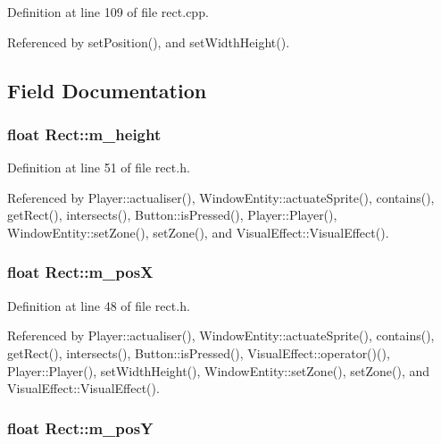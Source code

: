 Definition at line 109 of file rect.\-cpp.



Referenced by set\-Position(), and set\-Width\-Height().



\subsection{Field Documentation}
\hypertarget{class_rect_a1cec6187b299195fd06daef55e6a96f1}{
\subsubsection[{m\-\_\-height}]{\setlength{\rightskip}{0pt plus 5cm}float Rect\-::m\-\_\-height\hspace{0.3cm}{\ttfamily [protected]}}}\label{class_rect_a1cec6187b299195fd06daef55e6a96f1}


Definition at line 51 of file rect.\-h.



Referenced by Player\-::actualiser(), Window\-Entity\-::actuate\-Sprite(), contains(), get\-Rect(), intersects(), Button\-::is\-Pressed(), Player\-::\-Player(), Window\-Entity\-::set\-Zone(), set\-Zone(), and Visual\-Effect\-::\-Visual\-Effect().

\hypertarget{class_rect_aee32c031336a50f77c6cf882053e89f9}{
\subsubsection[{m\-\_\-pos\-X}]{\setlength{\rightskip}{0pt plus 5cm}float Rect\-::m\-\_\-pos\-X\hspace{0.3cm}{\ttfamily [protected]}}}\label{class_rect_aee32c031336a50f77c6cf882053e89f9}


Definition at line 48 of file rect.\-h.



Referenced by Player\-::actualiser(), Window\-Entity\-::actuate\-Sprite(), contains(), get\-Rect(), intersects(), Button\-::is\-Pressed(), Visual\-Effect\-::operator()(), Player\-::\-Player(), set\-Width\-Height(), Window\-Entity\-::set\-Zone(), set\-Zone(), and Visual\-Effect\-::\-Visual\-Effect().

\hypertarget{class_rect_a10680ccabe0068eda6c9637aa6eeb2fd}{
\subsubsection[{m\-\_\-pos\-Y}]{\setlength{\rightskip}{0pt plus 5cm}float Rect\-::m\-\_\-pos\-Y\hspace{0.3cm}{\ttfamily [protected]}}}\label{class_rect_a10680ccabe0068eda6c9637aa6eeb2fd}


